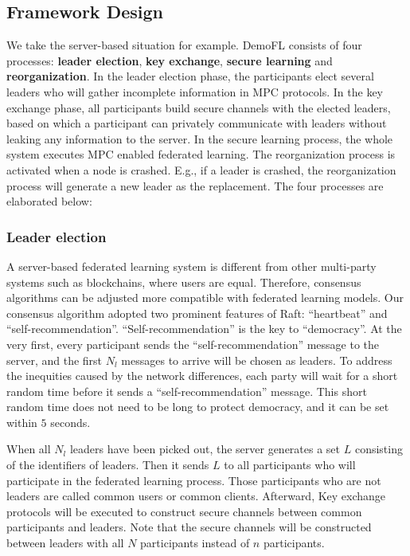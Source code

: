 \subsection{Framework Design}
We take the server-based situation for example. DemoFL consists of four processes: \textbf{leader election}, \textbf{key exchange}, \textbf{secure learning} and \textbf{reorganization}. In the leader election phase, the participants elect several leaders who will gather incomplete information in MPC protocols. In the key exchange phase, all participants build secure channels with the elected leaders, based on which a participant can privately communicate with leaders without leaking any information to the server. In the secure learning process, the whole system executes MPC enabled federated learning. The reorganization process is activated when a node is crashed. E.g., if a leader is crashed, the reorganization process will generate a new leader as the replacement. The four processes are elaborated below:

\subsubsection{\textbf{Leader election}}
A server-based federated learning system is different from other multi-party systems such as blockchains, where users are equal. Therefore, consensus algorithms can be adjusted more compatible with federated learning models. Our consensus algorithm adopted two prominent features of Raft: ``heartbeat'' and ``self-recommendation''. ``Self-recommendation'' is the key to ``democracy''. At the very first, every participant sends the ``self-recommendation'' message to the server, and the first $N_l$ messages to arrive will be chosen as leaders. To address the inequities caused by the network differences, each party will wait for a short random time before it sends a ``self-recommendation'' message. This short random time does not need to be long to protect democracy, and it can be set within $5$ seconds. 

When all $N_l$ leaders have been picked out, the server generates a set $L$ consisting of the identifiers of leaders. Then it sends $L$ to all participants who will participate in the federated learning process. Those participants who are not leaders are called common users or common clients. Afterward, Key exchange protocols will be executed to construct secure channels between common participants and leaders. Note that the secure channels will be constructed between leaders with all $N$ participants instead of $n$ participants.

